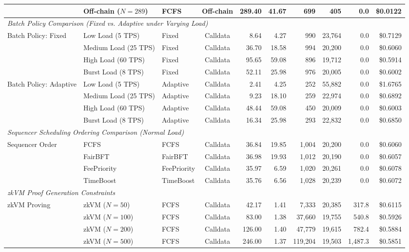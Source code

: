 \begin{table}[htbp]
{\begin{tabular}{lllcrrrrrr}
			& Off-chain ($N=289$) & FCFS & Off-chain & 289.40 & 41.67 & 699 & 405 & 0.0 & \$0.0122 \\
			\midrule
			\multicolumn{10}{l}{\textit{Batch Policy Comparison (Fixed vs. Adaptive under Varying Load)}} \\
			Batch Policy: Fixed & Low Load (5 TPS) & Fixed & Calldata & 8.64 & 4.27 & 990 & 23,764 & 0.0 & \$0.7129 \\
			& Medium Load (25 TPS) & Fixed & Calldata & 36.70 & 18.58 & 994 & 20,200 & 0.0 & \$0.6060 \\
			& High Load (60 TPS) & Fixed & Calldata & 95.65 & 59.08 & 896 & 19,712 & 0.0 & \$0.5914 \\
			& Burst Load (8 TPS) & Fixed & Calldata & 52.11 & 25.98 & 976 & 20,005 & 0.0 & \$0.6002 \\
			\midrule
			Batch Policy: Adaptive & Low Load (5 TPS) & Adaptive & Calldata & 2.41 & 4.25 & 252 & 55,882 & 0.0 & \$1.6765 \\
			& Medium Load (25 TPS) & Adaptive & Calldata & 9.23 & 18.10 & 259 & 22,974 & 0.0 & \$0.6892 \\
			& High Load (60 TPS) & Adaptive & Calldata & 48.44 & 59.08 & 450 & 20,009 & 0.0 & \$0.6003 \\
			& Burst Load (8 TPS) & Adaptive & Calldata & 16.34 & 25.98 & 293 & 22,832 & 0.0 & \$0.6850 \\
			\midrule
			\multicolumn{10}{l}{\textit{Sequencer Scheduling Ordering Comparison (Normal Load)}} \\
			Sequencer Order & FCFS & FCFS & Calldata & 36.84 & 19.85 & 1,004 & 20,200 & 0.0 & \$0.6060 \\
			& FairBFT & FairBFT & Calldata & 36.98 & 19.93 & 1,012 & 20,190 & 0.0 & \$0.6057 \\
			& FeePriority & FeePriority & Calldata & 35.97 & 6.59 & 1,020 & 20,261 & 0.0 & \$0.6078 \\
			& TimeBoost & TimeBoost & Calldata & 35.76 & 6.56 & 1,028 & 20,239 & 0.0 & \$0.6072 \\
			\midrule
			\multicolumn{10}{l}{\textit{zkVM Proof Generation Constraints}} \\
			zkVM Proving & zkVM ($N=50$) & FCFS & Calldata & 42.17 & 1.41 & 7,333 & 20,385 & 317.8 & \$0.6115 \\
			& zkVM ($N=100$) & FCFS & Calldata & 83.00 & 1.38 & 37,660 & 19,755 & 540.8 & \$0.5926 \\
			& zkVM ($N=200$) & FCFS & Calldata & 126.00 & 1.40 & 47,779 & 19,615 & 782.4 & \$0.5884 \\
			& zkVM ($N=500$) & FCFS & Calldata & 246.00 & 1.37 & 119,204 & 19,503 & 1,487.3 & \$0.5851 \\
			\bottomrule
		\end{tabular}%
	}
\end{table}
